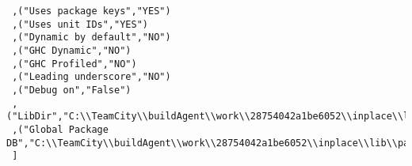 \begin{verbatim}
 ,("Uses package keys","YES")
 ,("Uses unit IDs","YES")
 ,("Dynamic by default","NO")
 ,("GHC Dynamic","NO")
 ,("GHC Profiled","NO")
 ,("Leading underscore","NO")
 ,("Debug on","False")
 ,("LibDir","C:\\TeamCity\\buildAgent\\work\\28754042a1be6052\\inplace\\lib")
 ,("Global Package DB","C:\\TeamCity\\buildAgent\\work\\28754042a1be6052\\inplace\\lib\\package.conf.d")
 ]
\end{verbatim}
